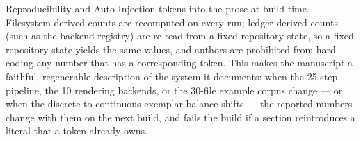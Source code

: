 \documentclass[
  ignorenonframetext,
]{beamer}
\begin{document}
\begin{frame}{Reproducibility and
Auto-Injection}
tokens into the prose at build time. Filesystem-derived counts are
recomputed on every run; ledger-derived counts (such as the backend
registry) are re-read from a fixed repository state, so a fixed
repository state yields the same values, and authors are prohibited from
hard-coding any number that has a corresponding token. This makes the
manuscript a faithful, regenerable description of the system it
documents: when the 25-step pipeline, the 10 rendering backends, or the
30-file example corpus change --- or when the discrete-to-continuous
exemplar balance shifts --- the reported numbers change with them on the
next build, and  fails the
build if a section reintroduces a literal that a token already owns.
\end{frame}
\end{document}
